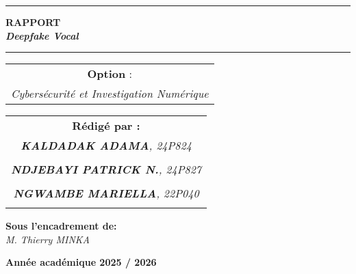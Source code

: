 \documentclass[memoire, 12pt]{report}
\begin{document}
\begin{titlepage}
\begin{center}
		\vspace{0.5cm}
		\begin{tabular}{l*{40}{@{\hskip 3.5cm}c@{\hskip5cm}} p{3.5cm} r}
		\end{tabular}
		
		\noindent\rule{\textwidth}{0.7mm}
		\Large{{\textbf{RAPPORT}}}\\
		\Large{{\textbf{\textit{Deepfake Vocal}}}}
		\noindent\rule{\textwidth}{0.7mm}
	\end{center}
		
	\begin{center}
	\begin{tabular}{c}
		
		\vspace{0.1cm}
		\normalsize
	
	
		\vspace{0.1cm}
		\normalsize\textbf{Option }:\\			
		\textsl{Cybersécurité et Investigation Numérique}
		
	\end{tabular}
	\end{center}
		
	\begin{center}
		\normalsize %
		\begin{tabular}{c}
			\vspace{0.07cm}
			\hspace{0.02cm} \textbf{\textbf{Rédigé par :}}\\
			\hspace{0.02cm} \textsl{\textbf{KALDADAK ADAMA}, 24P824}\\\\
			\hspace{0.02cm} \textsl{\textbf{NDJEBAYI PATRICK N.}, 24P827}\\\\
			\hspace{0.02cm} \textsl{\textbf{NGWAMBE  MARIELLA}, 22P040}\\\\
			
		\end{tabular}
	\end{center}
	
	\begin{center}
	\hspace{0.02cm} \textbf{Sous l'encadrement de:}\\
	\hspace{0.02cm} \textsl{M. Thierry MINKA}
	\end{center}
	
    
	\vspace{2cm}
	\begin{center}
		\textbf{Année académique 2025 / 2026}
	\end{center}
		
	\vspace{-1.4cm}
	
		
	\vfill%
	
\end{titlepage}
\tableofcontents
\newpage
\end{document}
